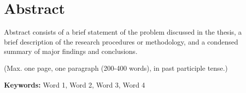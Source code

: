 \chapter{Abstract}


\hspace{\parindent} Abstract consists of a brief statement of the problem discussed in the thesis, a brief description of the research procedures or methodology, and a condensed summary of major findings and conclusions. 

(Max. one page, one paragraph (200-400 words), in past participle tense.)

\textbf{Keywords: } Word 1, Word 2, Word 3, Word 4